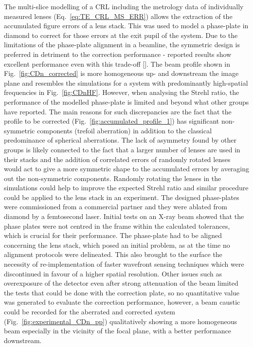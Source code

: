 \begin{refsection}
The multi-slice modelling of a CRL including the metrology data of individually measured lenses (Eq.~\ref{eq:TE_CRL_MS_ERR}) allows the extraction of the accumulated figure errors of a lens stack. This was used to model a phase-plate in diamond to correct for those errors at the exit pupil of the system. Due to the limitations of the phase-plate alignment in a beamline, the symmetric design is preferred in detriment to the correction performance - reported results show excellent performance even with this trade-off [\cite{Seiboth2020,Dhamgaye2020}]. The beam profile shown in Fig.~\ref{fig:CDn_corrected} is more homogeneous up- and downstream the image plane and resembles the simulations for a system with predominantly high-spatial frequencies in Fig.~\ref{fig:CDnHF}. However, when analysing the Strehl ratio, the performance of the modelled phase-plate is limited and beyond what other groups have reported. The main reasons for such discrepancies are the fact that the profile to be corrected (Fig.~\ref{fig:accumulated_profile_1}) has significant non-symmetric components (trefoil aberration) in addition to the classical predominance of spherical aberrations. The lack of asymmetry found by other groups is likely connected to the fact that a larger number of lenses are used in their stacks and the addition of correlated errors of randomly rotated lenses would act to give a more symmetric shape to the accumulated errors by averaging out the non-symmetric components. Randomly rotating the lenses in the simulations could help to improve the expected Strehl ratio and similar procedure could be applied to the lens stack in an experiment. The designed phase-plates were commissioned from a commercial partner and they were ablated from diamond by a femtosecond laser. Initial tests on an X-ray beam showed that the phase plates were not centred in the frame within the calculated tolerances, which is crucial for their performance. The phase-plate had to be aligned concerning the lens stack, which posed an initial problem, as at the time no alignment protocols were delineated. This also brought to the surface the necessity of re-implementation of faster wavefront sensing techniques which were discontinued in favour of a higher spatial resolution. Other issues such as overexposure of the detector even after strong attenuation of the beam limited the tests that could be done with the correction plate, so no quantitative value was generated to evaluate the correction performance, however, a beam caustic could be recorded for the aberrated and corrected system (Fig.~\ref{fig:experimental_CDn_pp}) qualitatively showing a more homogeneous beam especially in the vicinity of the focal plane, with a better performance downstream. 


\end{refsection}
